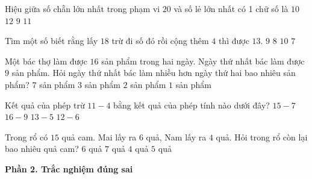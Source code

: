 \begin{ex} %
Hiệu giữa số chẵn lớn nhất trong phạm vi $20$ và số lẻ lớn nhất có 1 chữ số là
\choice
{$10$}
{$12$}
{$9$}
{\True $11$}
\end{ex}

\begin{ex} %
Tìm một số biết rằng lấy $18$ trừ đi số đó rồi cộng thêm $4$ thì được $13$.
\choice
{\True $9$}
{$8$}
{$10$}
{$7$}
\end{ex}

\begin{ex} %
Một bác thợ làm được $16$ sản phẩm trong hai ngày. Ngày thứ nhất bác làm được $9$ sản phẩm. Hỏi ngày thứ nhất bác làm nhiều hơn ngày thứ hai bao nhiêu sản phẩm?
\choice
{$7$ sản phẩm}
{$3$ sản phẩm}
{\True $2$ sản phẩm}
{$1$ sản phẩm}
\end{ex}

\begin{ex} %
Kết quả của phép trừ $11 - 4$ bằng kết quả của phép tính nào dưới đây?
\choice
{$15 - 7$}
{\True $16 - 9$}
{$13 - 5$}
{$12 - 6$}
\end{ex}

\begin{ex} %
Trong rổ có $15$ quả cam. Mai lấy ra $6$ quả, Nam lấy ra $4$ quả. Hỏi trong rổ còn lại bao nhiêu quả cam?
\choice
{$6$ quả}
{$7$ quả}
{$4$ quả}
{\True $5$ quả}
\end{ex}

\textbf{Phần 2. Trắc nghiệm đúng sai}

